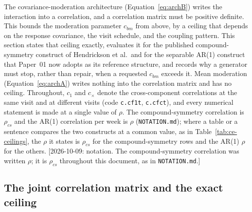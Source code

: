 \documentclass[11pt]{article}
\newcommand{\note}[1]{\textcolor{blue!60!black}{\small [#1]}}
\newcommand{\code}[1]{\texttt{#1}}
\begin{document}
The covariance-moderation architecture (Equation~\eqref{eq:archB})
writes the interaction into a correlation, and a correlation matrix
must be positive definite. This bounds the moderation parameter
$c_{bm}$ from above, by a ceiling that depends on the response
covariance, the visit schedule, and the coupling pattern. This section
states that ceiling exactly, evaluates it for the published
compound-symmetry construct of Hendrickson et al.\ and for the
separable AR(1) construct that Paper~01 now adopts as its reference
structure, and records why a generator must stop, rather than repair,
when a requested $c_{bm}$ exceeds it. Mean moderation
(Equation~\eqref{eq:archA}) writes nothing into the correlation matrix
and has no ceiling. Throughout, $c_1$ and $c_\times$ denote the
cross-component correlations at the same visit and at different visits
(code \code{c.cf1t}, \code{c.cfct}), and every numerical statement is
made at a single value of $\rho$. The compound-symmetry correlation is
$\rho_{cs}$ and the AR(1) correlation per week is $\rho$
(\code{NOTATION.md}); where a table or a sentence compares the two
constructs at a common value, as in Table~\ref{tab:ce-ceilings}, the
$\rho$ it states is $\rho_{cs}$ for the compound-symmetry rows and the
AR(1) $\rho$ for the others. \note{2026-10-09: notation. The
compound-symmetry correlation was written $\rho$; it is $\rho_{cs}$
throughout this document, as in \code{NOTATION.md}.}

\subsection{The joint correlation matrix and the exact ceiling}
\end{document}
